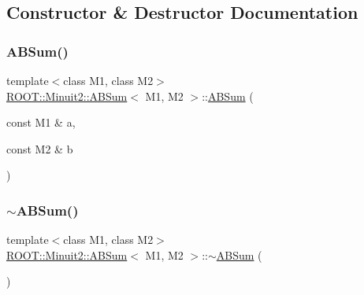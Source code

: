 \subsection{Constructor \& Destructor Documentation}
\mbox{\label{classROOT_1_1Minuit2_1_1ABSum_adaac8ec05b73e9e86e736faab9a685fe}} 
\subsubsection{\texorpdfstring{ABSum()}{ABSum()}\hspace{0.1cm}{\footnotesize\ttfamily [1/6]}}
{\footnotesize\ttfamily template$<$class M1, class M2$>$ \\
\mbox{\hyperlink{classROOT_1_1Minuit2_1_1ABSum}{R\+O\+O\+T\+::\+Minuit2\+::\+A\+B\+Sum}}$<$ M1, M2 $>$\+::\mbox{\hyperlink{classROOT_1_1Minuit2_1_1ABSum}{A\+B\+Sum}} (\begin{DoxyParamCaption}\item[{const M1 \&}]{a,  }\item[{const M2 \&}]{b }\end{DoxyParamCaption})\hspace{0.3cm}{\ttfamily [inline]}}

\mbox{\label{classROOT_1_1Minuit2_1_1ABSum_ab2d4441bcbcb38be86091d5eda7b63b2}} 
\subsubsection{\texorpdfstring{$\sim$ABSum()}{~ABSum()}\hspace{0.1cm}{\footnotesize\ttfamily [1/2]}}
{\footnotesize\ttfamily template$<$class M1, class M2$>$ \\
\mbox{\hyperlink{classROOT_1_1Minuit2_1_1ABSum}{R\+O\+O\+T\+::\+Minuit2\+::\+A\+B\+Sum}}$<$ M1, M2 $>$\+::$\sim$\mbox{\hyperlink{classROOT_1_1Minuit2_1_1ABSum}{A\+B\+Sum}} (\begin{DoxyParamCaption}{ }\end{DoxyParamCaption})\hspace{0.3cm}{\ttfamily [inline]}}

